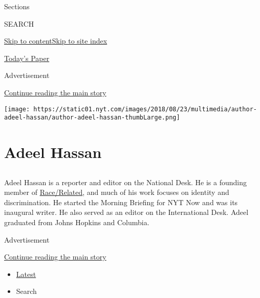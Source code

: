Sections

SEARCH

\protect\hyperlink{site-content}{Skip to
content}\protect\hyperlink{site-index}{Skip to site index}

\href{https://myaccount.nytimes.com/auth/login?response_type=cookie\&client_id=vi}{}

\href{https://www.nytimes.com/section/todayspaper}{Today's Paper}

Advertisement

\protect\hyperlink{after-top}{Continue reading the main story}

\texttt{[image: https://static01.nyt.com/images/2018/08/23/multimedia/author-adeel-hassan/author-adeel-hassan-thumbLarge.png]}

\hypertarget{adeel-hassan}{%
\section{Adeel Hassan}\label{adeel-hassan}}

\subsection{}

Adeel Hassan is a reporter and editor on the National Desk. He is a
founding member of
\href{https://www.nytimes.com/spotlight/race}{Race/Related}, and much of
his work focuses on identity and discrimination. He started the Morning
Briefing for NYT Now and was its inaugural writer. He also served as an
editor on the International Desk. Adeel graduated from Johns Hopkins and
Columbia.

Advertisement

\protect\hyperlink{after-mid1}{Continue reading the main story}

\begin{itemize}
\tightlist
\item
  \protect\hyperlink{stream-panel}{Latest}
\item
  Search
\end{itemize}

